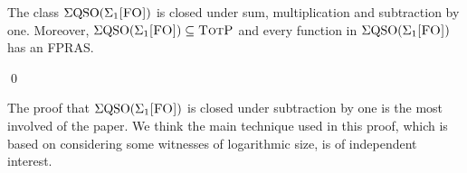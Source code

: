\begin{thm}\label{sigmafo-minusone}
The class $\Sigma{\rm QSO}(\Sigma_{1}\textsc{[FO]})$ is closed under sum, multiplication and subtraction by one. Moreover, $\Sigma{\rm QSO}(\Sigma_{1}\textsc{[FO]}) \subseteq \text{\sc TotP}$ and every function in $\Sigma{\rm QSO}(\Sigma_{1}\textsc{[FO]})$ has an FPRAS.
\end{thm}
\begin{leftbar}
\proof

\qed
\end{leftbar}
The proof that $\Sigma{\rm QSO}(\Sigma_{1}\textsc{[FO]})$ is closed under subtraction by one is the most involved of the paper. We think the main technique used in this proof, which is based on considering some witnesses of logarithmic size, is of independent interest.
